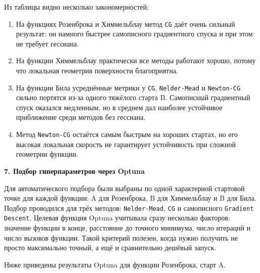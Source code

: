 \documentclass[12pt]{article}
\begin{document}
\begin{large}
\par Из таблицы видно несколько закономерностей:
\begin{enumerate}
    \item На функциях Розенброка и Химмельблау метод \texttt{CG} даёт очень сильный результат: он намного быстрее самописного градиентного спуска и при этом не требует гессиана.
    \item На функции Химмельблау практически все методы работают хорошо, потому что локальная геометрия поверхности благоприятна.
    \item На функции Била усреднённые метрики у \texttt{CG}, \texttt{Nelder-Mead} и \texttt{Newton-CG} сильно портятся из-за одного тяжёлого старта B. Самописный градиентный спуск оказался медленным, но в среднем дал наиболее устойчивое приближение среди методов без гессиана.
    \item Метод \texttt{Newton-CG} остаётся самым быстрым на хороших стартах, но его высокая локальная скорость не гарантирует устойчивость при сложной геометрии функции.
\end{enumerate}

\par \textbf{7. Подбор гиперпараметров через Optuna}

\par Для автоматического подбора были выбраны по одной характерной стартовой точке для каждой функции: A для Розенброка, B для Химмельблау и B для Била. Подбор проводился для трёх методов: \texttt{Nelder-Mead}, \texttt{CG} и самописного \texttt{Gradient Descent}. Целевая функция Optuna учитывала сразу несколько факторов: значение функции в конце, расстояние до точного минимума, число итераций и число вызовов функции. Такой критерий полезен, когда нужно получить не просто максимально точный, а ещё и сравнительно дешёвый запуск.

\par Ниже приведены результаты Optuna для функции Розенброка, старт A.


\end{large}
\end{document}
